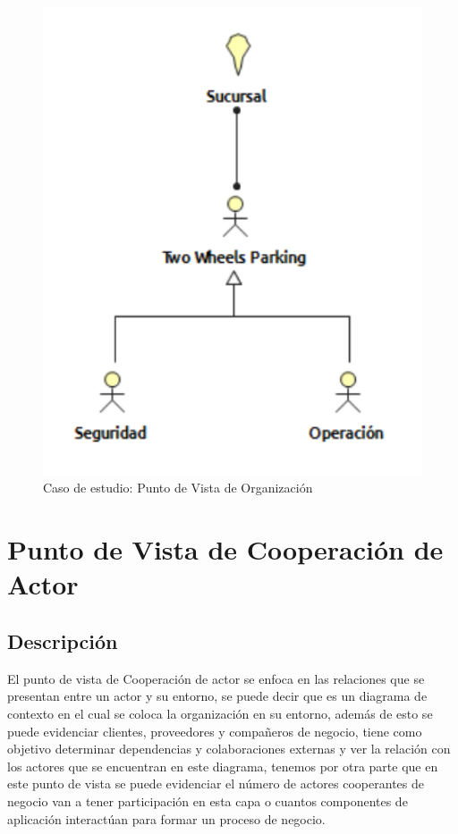 \begin{figure}[H]
	\centering
	\includegraphics[width=1.0\textwidth]{imagenes/Caso_estudio/Negocio/Organizacion.PDF}
	\caption{Caso de estudio: Punto de Vista de Organización}
	\label{fig:gap_analysis}
\end{figure}




\section{Punto de Vista de Cooperación de Actor}
\subsection{Descripción}
El punto de vista de Cooperación de actor se enfoca en las relaciones que se presentan entre un actor y su entorno, se puede decir que es un diagrama de contexto en el cual se coloca la organización en su entorno, además de esto se puede evidenciar clientes, proveedores y compañeros de negocio, tiene como objetivo determinar dependencias y colaboraciones externas y ver la relación con los actores que se encuentran en este diagrama, tenemos por otra parte que en este punto de vista se puede evidenciar el número de actores cooperantes  de negocio van a tener participación en esta capa o cuantos componentes de aplicación interactúan para formar un proceso de negocio.

